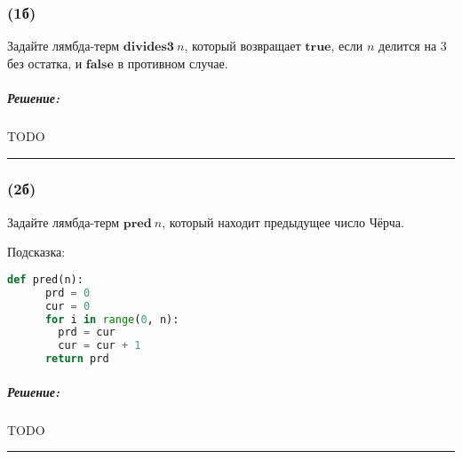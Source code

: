 \documentclass{article}
\newenvironment{proof}{\subparagraph{\hspace{-1em}Решение:\newline}}{\par\noindent\rule{\textwidth}{0.4pt}}
\newcommand{\term}[1]{\mathbf{#1}}
\begin{document}
    \subsubsection{(1б)}

    Задайте лямбда-терм $\term{divides3}~n$, который возвращает $\term{true}$, если $n$ делится на 3 без остатка, и $\term{false}$ в противном случае.

    \begin{proof}
        TODO %
    \end{proof}

    \subsubsection{(2б)}

    Задайте лямбда-терм $\term{pred}~n$, который находит предыдущее число Чёрча.

    Подсказка:
    \begin{lstlisting}[language=Python]
    def pred(n):
      prd = 0
      cur = 0
      for i in range(0, n):
        prd = cur
        cur = cur + 1
      return prd
    \end{lstlisting}

    \begin{proof}
        TODO %
    \end{proof}
\end{document}
